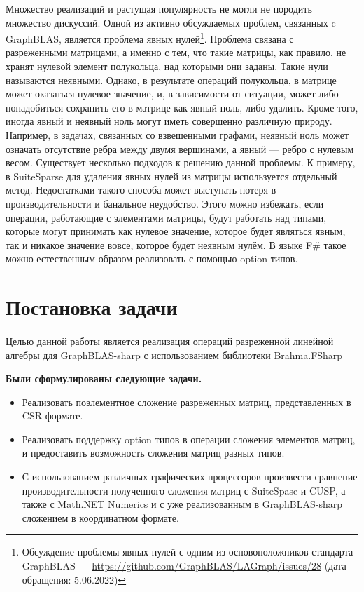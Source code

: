 \documentclass[14pt]{matmex-diploma-custom}
\begin{document}
Множество реализаций и растущая популярность не могли не породить множество дискуссий. Одной из активно обсуждаемых проблем, связанных c GraphBLAS, является проблема явных нулей\footnote{Обсуждение проблемы явных нулей с одним из основоположников стандарта GraphBLAS --- \url{https://github.com/GraphBLAS/LAGraph/issues/28} (дата обращения: 5.06.2022)}. Проблема связана с разреженными матрицами, а именно с тем, что такие матрицы, как правило, не хранят нулевой элемент полукольца, над которыми они заданы. Такие нули называются неявными. Однако, в результате операций полукольца, в матрице может оказаться нулевое значение, и, в зависимости от ситуации, может либо понадобиться сохранить его в матрице как явный ноль, либо удалить. Кроме того, иногда явный и неявный ноль могут иметь совершенно различную природу. Например, в задачах, связанных со взвешенными графами, неявный ноль может означать отсутствие ребра между двумя вершинами, а явный --- ребро с нулевым весом. Существует несколько подходов к решению данной проблемы. К примеру, в SuiteSparse для удаления явных нулей из матрицы используется отдельный метод. Недостатками такого способа может выступать потеря в производительности и банальное неудобство. Этого можно избежать, если операции, работающие с элементами матрицы, будут работать над типами, которые могут принимать как нулевое значение, которое будет являться явным, так и никакое значение вовсе, которое будет неявным нулём. В языке F\# такое можно естественным образом реализовать с помощью option типов.

\section{Постановка задачи}
\paragraph{} Целью данной работы является реализация операций разреженной линейной алгебры для GraphBLAS-sharp с использованием библиотеки Brahma.FSharp

  \textbf{Были сформулированы следующие задачи.}
  \begin{itemize}
    \item Реализовать поэлементное сложение разреженных матриц, представленных в CSR формате.
    \item Реализовать поддержку option типов в операции сложения элементов матриц, и предоставить возможность сложения матриц разных типов.
    \item С использованием различных графических процессоров произвести сравнение производительности полученного сложения матриц с SuiteSpase и CUSP, а также с Math.NET Numerics и с уже реализованным в GraphBLAS-sharp сложением в координатном формате.
  \end{itemize}
\end{document}
